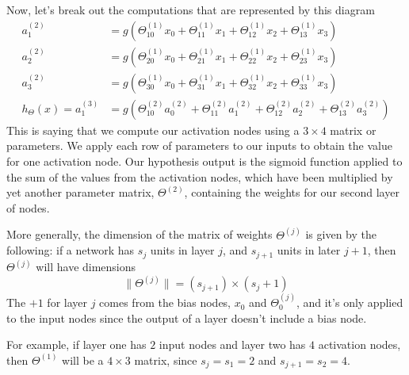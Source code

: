 Now, let's break out the computations that are represented by this diagram
\begin{subequations}
\begin{align}
a_1^{(2)} &= g\left(	\Theta_{10}^{(1)} x_0 + \Theta_{11}^{(1)} x_1 + \Theta_{12}^{(1)} x_2 + \Theta_{13}^{(1)} x_3   	\right) \\
a_2^{(2)} &= g\left(	\Theta_{20}^{(1)} x_0 + \Theta_{21}^{(1)} x_1 + \Theta_{22}^{(1)} x_2 + \Theta_{23}^{(1)} x_3   	\right) \\
a_3^{(2)} &= g\left(	\Theta_{30}^{(1)} x_0 + \Theta_{31}^{(1)} x_1 + \Theta_{32}^{(1)} x_2 + \Theta_{33}^{(1)} x_3   	\right) \\
h_\Theta\left(x\right) = a_1^{(3)} &= g\left(	\Theta_{10}^{(2)} a_0^{(2)} + \Theta_{11}^{(2)} a_1^{(2)} + \Theta_{12}^{(2)} a_2^{(2)} + \Theta_{13}^{(2)} a_3^{(2)}   	\right) 
\end{align}
\label{chapnnrepr-sectmodelrepr1-definehiddenlayeractivations}
\end{subequations}
This is saying that we compute our activation nodes using a $3\times 4$ matrix or parameters. We apply each row of parameters to our inputs to obtain the value for one activation node. Our hypothesis output is the sigmoid function applied to the sum of the values from the activation nodes, which have been multiplied by yet another parameter matrix, $\Theta^{(2)}$, containing the weights for our second layer of nodes. 

More generally, the dimension of the matrix of weights $\Theta^{(j)}$ is given by the following: if a network has $s_j$ units in layer $j$, and $s_{j+1}$ units in later $j+1$, then $\Theta^{(j)}$ will have dimensions 
\begin{equation}
\| \Theta^{(j)} \| = \left(s_{j+1}\right)\times\left(s_j + 1\right)
\end{equation}
The $+1$ for layer $j$ comes from the bias nodes, $x_0$ and $\Theta_0^{(j)}$, and it's only applied to the input nodes since the output of a layer doesn't include a bias node. 

For example, if layer one has $2$ input nodes and layer two has $4$ activation nodes, then $\Theta^{(1)}$ will be a $4\times 3$ matrix, since $s_j = s_1 = 2$ and $s_{j+1} = s_2 = 4$.

